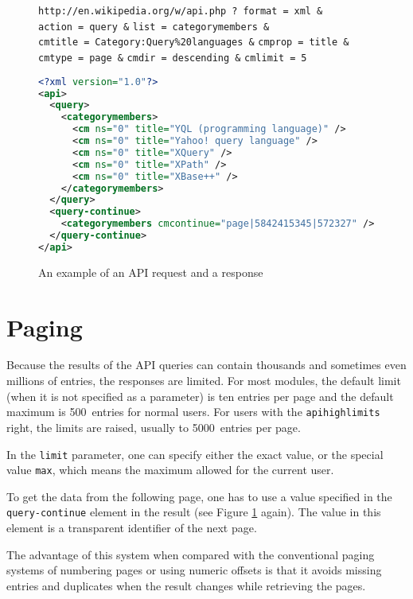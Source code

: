 \begin{figure}[htbp]
\texttt{http://en.wikipedia.org/w/api.php}~\texttt{?}\
\texttt{format}~\texttt{=}~\texttt{xml}~\texttt{\&}
\texttt{action}~\texttt{=}~\texttt{query}~\texttt{\&}
\texttt{list}~\texttt{=}~\texttt{categorymembers}~\texttt{\&}
\texttt{cmtitle}~\texttt{=}~\texttt{Category:Query\%20languages}~\texttt{\&}
\texttt{cmprop}~\texttt{=}~\texttt{title}~\texttt{\&}
\texttt{cmtype}~\texttt{=}~\texttt{page}~\texttt{\&}
\texttt{cmdir}~\texttt{=}~\texttt{descending}~\texttt{\&}
\texttt{cmlimit}~\texttt{=}~\texttt{5}

\begin{lstlisting}[language=xml]
<?xml version="1.0"?>
<api>
  <query>
    <categorymembers>
      <cm ns="0" title="YQL (programming language)" />
      <cm ns="0" title="Yahoo! query language" />
      <cm ns="0" title="XQuery" />
      <cm ns="0" title="XPath" />
      <cm ns="0" title="XBase++" />
    </categorymembers>
  </query>
  <query-continue>
    <categorymembers cmcontinue="page|5842415345|572327" />
  </query-continue>
</api>
\end{lstlisting}

\caption{An example of an API request and a response}
\label{API example}
\end{figure}

\section{Paging}

Because the results of the API queries can contain thousands and sometimes even millions of entries,
the responses are limited.
For most modules, the default limit (when it is not specified as a parameter) is ten entries per page
and the default maximum is 500~entries for normal users.
For users with the \texttt{apihighlimits} right, the limits are raised, usually to 5000~entries per page.

In the \texttt{limit} parameter, one can specify either the exact value,
or the special value \texttt{max}, which means the maximum allowed for the current user.

To get the data from the following page, one has to use a value specified in the \texttt{query-continue}
element in the result (see Figure \ref{API example} again).
The value in this element is a transparent identifier of the next page.

The advantage of this system when compared with the conventional paging systems of numbering pages
or using numeric offsets is that it avoids missing entries and duplicates when the result
changes while retrieving the pages.

